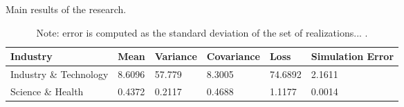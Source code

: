 \begin{table}[htb]
  \small
  \caption{Main results of the research.}
  \label{table:main_results}
  \begin{tabu} to \textwidth {X[4]X[r]X[r]X[r]X[r]X[r]}
      \toprule
      \textbf{Industry} & Mean & Variance & Covariance & Loss & Simulation Error \\\midrule
      Industry \& Technology                      & 8.6096 & 57.779 & 8.3005 & 74.6892 & 2.1611 \\
      Science \& Health                 & 0.4372 & 0.2117 & 0.4688 & 1.1177 & 0.0014 \\ %
      \bottomrule
  \end{tabu}
  \caption*{\footnotesize Note: error is computed as the standard deviation of the set of realizations... .}
\end{table}